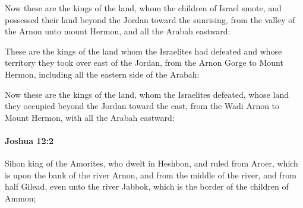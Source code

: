 			\begin{versebox}
					\item[BHS] 
					\item[ASV] Now these are the kings of the land, whom the children of Israel smote, and possessed their land beyond the Jordan toward the sunrising, from the valley of the Arnon unto mount Hermon, and all the Arabah eastward:
					\item[NIV] These are the kings of the land whom the Israelites had defeated and whose territory they took over east of the Jordan, from the Arnon Gorge to Mount Hermon, including all the eastern side of the Arabah:
					\item[NRSV] Now these are the kings of the land, whom the Israelites defeated, whose land they occupied beyond the Jordan toward the east, from the Wadi Arnon to Mount Hermon, with all the Arabah eastward:
			\end{versebox}

		\paragraph{Joshua 12:2} %
			\label{JOSHUA-12-2}

			Sihon king of the Amorites, who dwelt in Heshbon, and ruled from Aroer, which is upon the bank of the river Arnon, and from the middle of the river, and from half Gilead, even unto the river Jabbok, which is the border of the children of Ammon;

